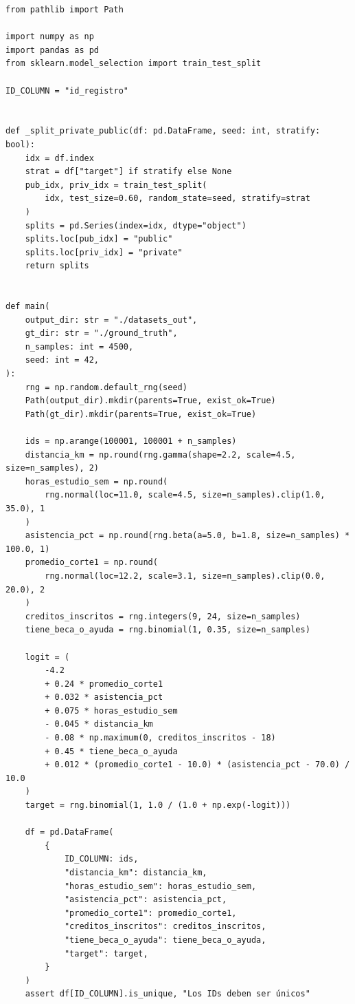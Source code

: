 \documentclass[11pt,a4paper]{article}
\begin{document}
\begin{lstlisting}
from pathlib import Path

import numpy as np
import pandas as pd
from sklearn.model_selection import train_test_split

ID_COLUMN = "id_registro"


def _split_private_public(df: pd.DataFrame, seed: int, stratify: bool):
    idx = df.index
    strat = df["target"] if stratify else None
    pub_idx, priv_idx = train_test_split(
        idx, test_size=0.60, random_state=seed, stratify=strat
    )
    splits = pd.Series(index=idx, dtype="object")
    splits.loc[pub_idx] = "public"
    splits.loc[priv_idx] = "private"
    return splits


def main(
    output_dir: str = "./datasets_out",
    gt_dir: str = "./ground_truth",
    n_samples: int = 4500,
    seed: int = 42,
):
    rng = np.random.default_rng(seed)
    Path(output_dir).mkdir(parents=True, exist_ok=True)
    Path(gt_dir).mkdir(parents=True, exist_ok=True)

    ids = np.arange(100001, 100001 + n_samples)
    distancia_km = np.round(rng.gamma(shape=2.2, scale=4.5, size=n_samples), 2)
    horas_estudio_sem = np.round(
        rng.normal(loc=11.0, scale=4.5, size=n_samples).clip(1.0, 35.0), 1
    )
    asistencia_pct = np.round(rng.beta(a=5.0, b=1.8, size=n_samples) * 100.0, 1)
    promedio_corte1 = np.round(
        rng.normal(loc=12.2, scale=3.1, size=n_samples).clip(0.0, 20.0), 2
    )
    creditos_inscritos = rng.integers(9, 24, size=n_samples)
    tiene_beca_o_ayuda = rng.binomial(1, 0.35, size=n_samples)

    logit = (
        -4.2
        + 0.24 * promedio_corte1
        + 0.032 * asistencia_pct
        + 0.075 * horas_estudio_sem
        - 0.045 * distancia_km
        - 0.08 * np.maximum(0, creditos_inscritos - 18)
        + 0.45 * tiene_beca_o_ayuda
        + 0.012 * (promedio_corte1 - 10.0) * (asistencia_pct - 70.0) / 10.0
    )
    target = rng.binomial(1, 1.0 / (1.0 + np.exp(-logit)))

    df = pd.DataFrame(
        {
            ID_COLUMN: ids,
            "distancia_km": distancia_km,
            "horas_estudio_sem": horas_estudio_sem,
            "asistencia_pct": asistencia_pct,
            "promedio_corte1": promedio_corte1,
            "creditos_inscritos": creditos_inscritos,
            "tiene_beca_o_ayuda": tiene_beca_o_ayuda,
            "target": target,
        }
    )
    assert df[ID_COLUMN].is_unique, "Los IDs deben ser únicos"


\end{lstlisting}
\end{document}
